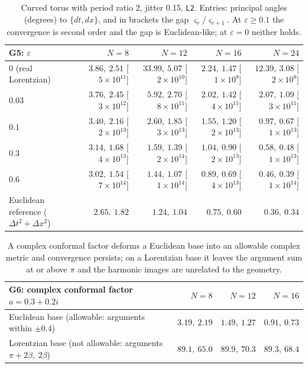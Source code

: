 \documentclass[11pt]{article}
\theoremstyle{definition}
\theoremstyle{plain}
\theoremstyle{remark}
\newcommand{\ttt}[1]{\texttt{#1}}
\begin{document}
\begin{table}[ht]\centering\footnotesize
\begin{tabular}{@{}lrrrr@{}}
\toprule
G5: \(\varepsilon\) & \(N=8\) & \(N=12\) & \(N=16\) & \(N=24\) \\
\midrule
\(0\) (real Lorentzian) & \(3.86,\ 2.51\) [\(5\!\times\!10^{11}\)] & \(33.99,\ 5.07\) [\(2\!\times\!10^{10}\)] & \(2.24,\ 1.47\) [\(1\!\times\!10^{8}\)] & \(12.39,\ 3.08\) [\(2\!\times\!10^{8}\)] \\
\(0.03\) & \(3.76,\ 2.45\) [\(3\!\times\!10^{12}\)] & \(5.92,\ 2.70\) [\(8\!\times\!10^{11}\)] & \(2.02,\ 1.42\) [\(4\!\times\!10^{11}\)] & \(2.07,\ 1.09\) [\(3\!\times\!10^{11}\)] \\
\(0.1\) & \(3.40,\ 2.16\) [\(2\!\times\!10^{13}\)] & \(2.60,\ 1.85\) [\(3\!\times\!10^{13}\)] & \(1.55,\ 1.20\) [\(2\!\times\!10^{13}\)] & \(0.97,\ 0.67\) [\(1\!\times\!10^{13}\)] \\
\(0.3\) & \(3.14,\ 1.68\) [\(4\!\times\!10^{13}\)] & \(1.59,\ 1.39\) [\(2\!\times\!10^{14}\)] & \(1.04,\ 0.90\) [\(2\!\times\!10^{13}\)] & \(0.58,\ 0.48\) [\(1\!\times\!10^{13}\)] \\
\(0.6\) & \(3.02,\ 1.54\) [\(7\!\times\!10^{14}\)] & \(1.44,\ 1.07\) [\(1\!\times\!10^{14}\)] & \(0.89,\ 0.69\) [\(4\!\times\!10^{13}\)] & \(0.46,\ 0.39\) [\(1\!\times\!10^{14}\)] \\
\midrule
Euclidean reference (\(\Delta t^2+\Delta x^2\)) & \(2.65,\ 1.82\) & \(1.24,\ 1.04\) & \(0.75,\ 0.60\) & \(0.36,\ 0.34\) \\
\bottomrule
\end{tabular}
\caption{Curved torus with period ratio 2, jitter 0.15, \ttt{L2}. Entries: principal angles (degrees) to \(\{dt,dx\}\), and in brackets the gap \(\varsigma_r/\varsigma_{r+1}\). At \(\varepsilon\ge0.1\) the convergence is second order and the gap is Euclidean-like; at \(\varepsilon=0\) neither holds.}
\label{tab:KS}
\end{table}

\begin{table}[ht]\centering\footnotesize
\begin{tabular}{@{}lrrr@{}}
\toprule
G6: complex conformal factor \(a=0.3+0.2i\) & \(N=8\) & \(N=12\) & \(N=16\) \\
\midrule
Euclidean base (allowable: arguments within \(\pm0.4\)) & \(3.19,\ 2.19\) & \(1.49,\ 1.27\) & \(0.91,\ 0.73\) \\
Lorentzian base (not allowable: arguments \(\pi+2\beta,\ 2\beta\)) & \(89.1,\ 65.0\) & \(89.9,\ 70.3\) & \(89.3,\ 68.4\) \\
\bottomrule
\end{tabular}
\caption{A complex conformal factor deforms a Euclidean base into an allowable complex metric and convergence persists; on a Lorentzian base it leaves the argument sum at or above \(\pi\) and the harmonic images are unrelated to the geometry.}
\label{tab:conf}
\end{table}
\end{document}
